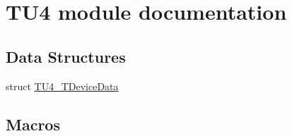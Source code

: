 \hypertarget{group___t_u4__module}{\section{T\-U4 module documentation}
\label{group___t_u4__module}
}
\subsection*{Data Structures}
\begin{DoxyCompactItemize}
\item 
struct \hyperlink{struct_t_u4___t_device_data}{T\-U4\-\_\-\-T\-Device\-Data}
\end{DoxyCompactItemize}
\subsection*{Macros}

